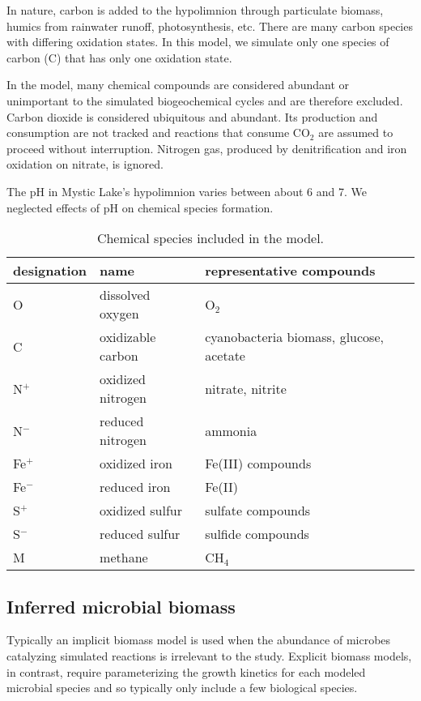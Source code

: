 \documentclass{report}
\begin{document}
In nature, carbon is added to the hypolimnion through particulate biomass, humics from
rainwater runoff, photosynthesis,
etc. There are many carbon species with differing oxidation states. In this model, we 
simulate only one species of carbon (C) that has only one oxidation state.

In the model, many chemical compounds are considered abundant or unimportant to the simulated biogeochemical cycles and are therefore excluded. Carbon dioxide is considered ubiquitous and abundant. Its production and consumption are not tracked and reactions that consume
CO$_2$ are assumed to proceed without interruption. Nitrogen gas, produced by denitrification
and iron oxidation on nitrate, is ignored.

The pH in Mystic Lake's hypolimnion varies between about 6 and 7. We neglected effects of pH on chemical species formation.

\begin{table}
\centering
\begin{tabular}{ l l l }
\toprule
designation & name  & representative compounds \\
\midrule
O   & dissolved oxygen    & O$_2$ \\
C   & oxidizable carbon & cyanobacteria biomass, glucose, acetate \\
N$^+$ & oxidized nitrogen &  nitrate, nitrite \\
N$^-$ & reduced nitrogen  & ammonia \\
Fe$^+$ &  oxidized iron  & Fe(III) compounds  \\
Fe$^-$ &  reduced iron  & Fe(II)  \\
S$^+$ &  oxidized sulfur  & sulfate compounds \\
S$^-$ &  reduced sulfur  & sulfide compounds  \\
M   &   methane &   CH$_4$ \\
\bottomrule
\end{tabular}
\caption{Chemical species included in the model.}
\label{tab:chemical_species}
\end{table}

\subsection{Inferred microbial biomass}
Typically an implicit biomass model is used when the abundance of microbes catalyzing
simulated reactions is irrelevant to the study. Explicit biomass models, in contrast, require parameterizing the growth kinetics for each modeled microbial species and so typically only include a few biological species. 
\end{document}
